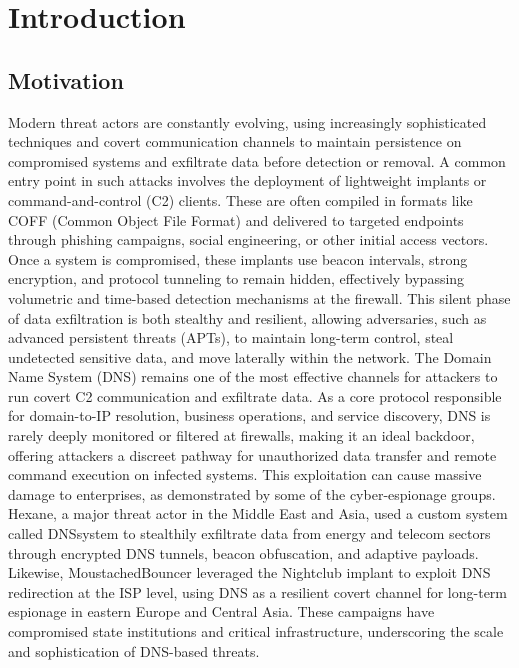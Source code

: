 \documentclass [11pt, proquest] {uwthesis}[2020/02/24]
\begin{document}
%
%

%
 
 
 
%
%

\textpages
 
 
\chapter {Introduction}
\section{Motivation}
Modern threat actors are constantly evolving, using increasingly sophisticated techniques and covert communication channels to maintain persistence on compromised systems and exfiltrate data before detection or removal. A common entry point in such attacks involves the deployment of lightweight implants or command-and-control (C2) clients. These are often compiled in formats like COFF (Common Object File Format) and delivered to targeted endpoints through phishing campaigns, social engineering, or other initial access vectors.
Once a system is compromised, these implants use beacon intervals, strong encryption, and protocol tunneling to remain hidden, effectively bypassing volumetric and time-based detection mechanisms at the firewall. This silent phase of data exfiltration is both stealthy and resilient, allowing adversaries, such as advanced persistent threats (APTs), to maintain long-term control, steal undetected sensitive data, and move laterally within the network.
The Domain Name System (DNS) remains one of the most effective channels for attackers to run covert C2 communication and exfiltrate data. As a core protocol responsible for domain-to-IP resolution, business operations, and service discovery, DNS is rarely deeply monitored or filtered at firewalls, making it an ideal backdoor, offering attackers a discreet pathway for unauthorized data transfer and remote command execution on infected systems. 
This exploitation can cause massive damage to enterprises, as demonstrated by some of the cyber-espionage groups. Hexane, a major threat actor in the Middle East and Asia, used a custom system called DNSsystem to stealthily exfiltrate data from energy and telecom sectors through encrypted DNS tunnels, beacon obfuscation, and adaptive payloads. Likewise, MoustachedBouncer leveraged the Nightclub implant to exploit DNS redirection at the ISP level, using DNS as a resilient covert channel for long-term espionage in eastern Europe and Central Asia. These campaigns have compromised state institutions and critical infrastructure, underscoring the scale and sophistication of DNS-based threats.
\end{document}
